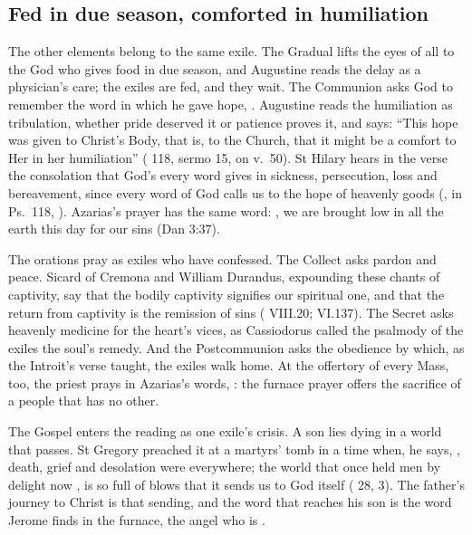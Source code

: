 \subsection{Fed in due season, comforted in humiliation}

The other elements belong to the same exile. The Gradual lifts the eyes of all
to the God who gives food in due season, and Augustine
reads the delay as a physician's care; the exiles are fed, and they wait. The Communion asks
God to remember the word in which he gave hope, . Augustine reads the humiliation as tribulation, whether pride
deserved it or patience proves it, and says: ``This hope was given to Christ's
Body, that is, to the Church, that it might be a comfort to Her in her
humiliation'' ( 118, sermo 15, on v.~50). St
Hilary hears in the verse the consolation that God's every word gives in
sickness, persecution, loss and bereavement, since every word of God calls us
to the hope of heavenly goods (, in Ps.~118,
). Azarias's prayer has the same word: , we are brought low in all the
earth this day for our sins (Dan 3:37).

The orations pray as exiles who have confessed. The Collect asks pardon and
peace. Sicard of Cremona and William Durandus, expounding these chants of captivity,
say that the bodily captivity signifies our spiritual one, and that the
return from captivity is the remission of sins ( VIII.20;
 VI.137). The Secret asks heavenly medicine for the heart's
vices, as Cassiodorus called the psalmody of the exiles the soul's remedy. And
the Postcommunion asks the obedience by which, as the Introit's verse taught,
the exiles walk home. At the offertory of every Mass, too, the priest prays in
Azarias's words, : the furnace prayer offers the sacrifice of a people that has no
other.

The Gospel enters the reading as one exile's crisis. A son lies dying in a world
that passes. St Gregory preached it at a martyrs' tomb in a time when, he says,
, death, grief and
desolation were everywhere; the world that once held men by delight now
, is so
full of blows that it sends us to God itself (
28, 3). The father's journey to Christ is that sending, and the word that reaches
his son is the word Jerome finds in the furnace, the angel who is .


